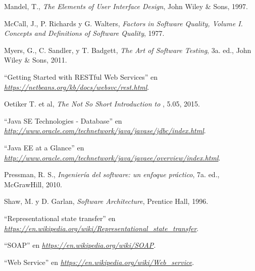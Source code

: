 \begin{thebibliography}{}
	Mandel, T.,
	\emph{The Elements of User Interface Design},
	John Wiley \& Sons, 
	1997.
		
	McCall, J., P. Richards y G. Walters,
	\emph{Factors in Software Quality, Volume I. Concepts and Definitions of Software Quality}, 
	1977.

	Myers, G., C. Sandler, y T. Badgett,
	\emph{The Art of Software Testing},
	3a. ed.,
	John Wiley \& Sons, 
	2011.
	
	``Getting Started with RESTful Web Services'' en
	\emph{\url{https://netbeans.org/kb/docs/websvc/rest.html}}.
	
	Oetiker T. et al,
	\emph{The Not So Short Introduction to \LaTeXe},
	5.05,
	2015.
	
	``Java SE Technologies - Database'' en	
	\emph{\url{http://www.oracle.com/technetwork/java/javase/jdbc/index.html}}.
	
	``Java EE at a Glance'' en
	\emph{\url{http://www.oracle.com/technetwork/java/javaee/overview/index.html}}.
	
	Pressman, R. S.,
	\emph{Ingeniería del software: un enfoque práctico},
	7a. ed.,
	McGrawHill,
	2010.
	
	Shaw, M. y D. Garlan, 
	\emph{Software Architecture}, 
	Prentice Hall, 
	1996.
	
	``Representational state transfer'' en
	\emph{\url{https://en.wikipedia.org/wiki/Representational_state_transfer}}.
	
	``SOAP'' en
	\emph{\url{https://en.wikipedia.org/wiki/SOAP}}.
	
	``Web Service'' en
	\emph{\url{https://en.wikipedia.org/wiki/Web_service}}.

\end{thebibliography}